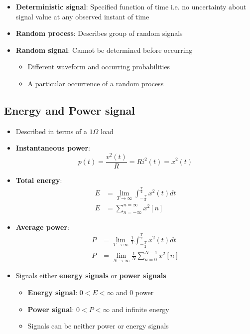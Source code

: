 \documentclass[conference]{IEEEtran}
\begin{document}
\begin{itemize}
  \item \textbf{Deterministic signal}: Specified function of time i.e. no uncertainty about signal
  value at any observed instant of time 

  \item \textbf{Random process}: Describes group of random signals 
  \item \textbf{Random signal}: Cannot be determined before occurring
  \begin{itemize}
    \item Different waveform and occurring probabilities
    \item A particular occurrence of a random process 
  \end{itemize}
\end{itemize}

\pagebreak
\subsection{Energy and Power signal}

\begin{itemize}
  \item Described in terms of a $1 \Omega$ load
  
  \item \textbf{Instantaneous power}: 
  $$
    p(t) = \frac{v^2(t)}{R} = Ri^2(t) = x^2(t)
  $$
  
  \item \textbf{Total energy}: 
  \begin{align*}
    E &= \lim_{T\rightarrow \infty} \int_{-\frac{T}{2}}^{\frac{T}{2}} x^2(t) dt \\
    E &= \sum_{n=-\infty}^{n=\infty} x^2[n]
  \end{align*}

  \item \textbf{Average power}: 
  \begin{align*}
    P &= \lim_{T\rightarrow \infty} \frac{1}{T} \int_{-\frac{T}{2}}^{\frac{T}{2}} x^2(t) dt   \\
    P &= \lim_{N \rightarrow \infty} \frac{1}{N} \sum_{n=0}^{N-1} x^2[n]
  \end{align*}

  \item Signals either \textbf{energy signals} or \textbf{power signals}
  \begin{itemize}
    \item \textbf{Energy signal}: $0<E<\infty$ and $0$ power 
    \item \textbf{Power signal}: $0<P<\infty$ and infinite energy
    \item Signals can be neither power or energy signals
  \end{itemize}
\end{itemize}
\end{document}
